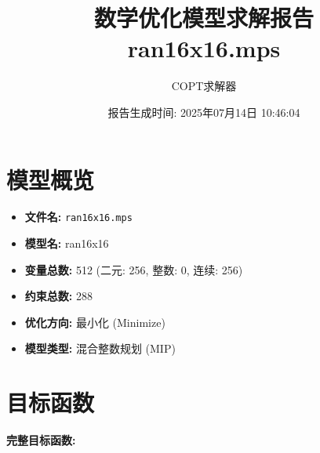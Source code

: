 \documentclass[a4paper,10pt]{article}
\title{数学优化模型求解报告\\{\large ran16x16.mps}}
\author{COPT求解器}
\date{报告生成时间: 2025年07月14日 10:46:04}
\begin{document}
\maketitle
\tableofcontents
\newpage

\section{模型概览}
\begin{itemize}
    \item \textbf{文件名:} \texttt{ran16x16.mps}
    \item \textbf{模型名:} ran16x16
    \item \textbf{变量总数:} 512 (二元: 256, 整数: 0, 连续: 256)
    \item \textbf{约束总数:} 288
    \item \textbf{优化方向:} 最小化 (Minimize)
    \item \textbf{模型类型:} 混合整数规划 (MIP)
\end{itemize}
\section{目标函数}

\textbf{完整目标函数:}
\end{document}
